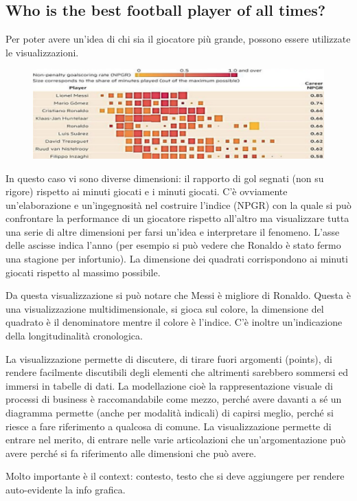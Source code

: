 \documentclass[12pt,a4paper]{report}
\begin{document}
\subsection{Who is the best football player of all times? }

Per poter avere un'idea di chi sia il giocatore più grande, possono essere utilizzate le visualizzazioni. 

\begin{figure}[h]
	\centering
	\includegraphics[width=0.5\linewidth]{imgs datavis/Football.png}
	\caption{}
	\label{fig:Football}
\end{figure} 

In questo caso vi sono diverse dimensioni: il rapporto di gol segnati (non su rigore) rispetto ai minuti giocati e i minuti giocati. C'è ovviamente un'elaborazione e un'ingegnosità nel costruire l'indice (NPGR) con la quale si può confrontare la performance di un giocatore rispetto all'altro ma visualizzare tutta una serie di altre dimensioni per farsi un'idea e interpretare il fenomeno. L'asse delle ascisse indica l'anno (per esempio si può vedere che Ronaldo è stato fermo una stagione per infortunio). La dimensione dei quadrati corrispondono ai minuti giocati rispetto al massimo possibile. 

Da questa visualizzazione si può notare che Messi è migliore di Ronaldo. Questa è una visualizzazione multidimensionale, si gioca sul colore, la dimensione del quadrato è il denominatore mentre il colore è l'indice. C'è inoltre un'indicazione della longitudinalità cronologica. 

La visualizzazione permette di discutere, di tirare fuori argomenti (points), di rendere facilmente discutibili degli elementi che altrimenti sarebbero sommersi ed immersi in tabelle di dati. La modellazione cioè la rappresentazione visuale di processi di business è raccomandabile come mezzo, perché avere davanti a sé un diagramma permette (anche per modalità indicali) di capirsi meglio, perché si riesce a fare riferimento a qualcosa di comune. La visualizzazione permette di entrare nel merito, di entrare nelle varie articolazioni che un'argomentazione può avere perché si fa riferimento alle dimensioni che può avere. 

Molto importante è il context: contesto, testo che si deve aggiungere per rendere auto-evidente la info grafica.
\end{document}
